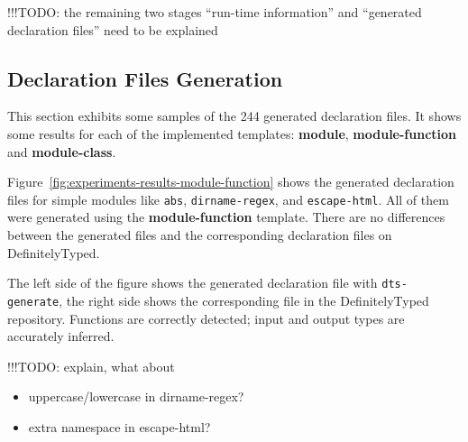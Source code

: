 \documentclass[a4paper,english,cleveref, autoref]{lipics-v2019}
\newcommand{\figref}[1]{Figure~\ref{#1}}
\begin{document}
!!!TODO: the remaining two stages ``run-time information'' and
``generated declaration files'' need to be explained

\subsection{Declaration Files Generation}
\label{sec:experiments-declaration-files-generation}

This section exhibits some samples of the 244 generated
declaration files. It shows some results for each of the implemented
templates: \textbf{module}, \textbf{module-function} and
\textbf{module-class}. 

\figref{fig:experiments-results-module-function} shows the generated
declaration files for simple modules like \texttt{abs},
\texttt{dirname-regex}, and \texttt{escape-html}. All of them were
generated using the \textbf{module-function} template. There are no
differences between the generated files and the corresponding
declaration files on DefinitelyTyped. 

The left side of the figure shows the generated declaration file with
\lstinline{dts-generate}, the right side shows the corresponding file
in the DefinitelyTyped repository. Functions are correctly detected; input
and output types are accurately inferred.

!!!TODO: explain, what about
\begin{itemize}
\item uppercase/lowercase in dirname-regex?
\item extra namespace in escape-html?
\end{itemize}
 
\end{document}
